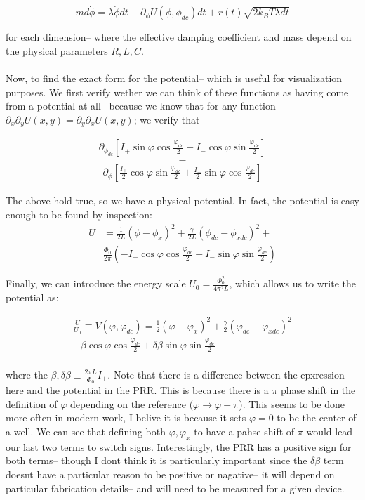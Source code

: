 \documentclass[paper=a4, twocolumn, fontsize=10pt]{article} %
\numberwithin{equation}{section} %
\numberwithin{figure}{section} %
\numberwithin{table}{section} %
\begin{document}
\[ m d \dot{\phi} = \lambda \dot{\phi} dt - \partial_\phi U(\phi, \phi_{dc}) dt + r(t) \sqrt{2 k_B T \lambda dt} \]

for each dimension-- where the effective damping coefficient and mass depend on the physical parameters $R,L,C$.
\\
\\
Now, to find the exact form for the potential-- which is useful for visualization purposes. We first verify wether we can think of these functions as having come from a potential at all-- because we know that for any function $\partial_{x} \partial_{y} U(x,y) = \partial_{y} \partial_{x} U(x,y)$; we verify that

\begin{align}
 \partial_{\phi_{dc}}\left[I_{+} \sin \varphi \cos \frac{\varphi_{dc}}{2} + I_{-} \cos \varphi \sin \frac{\varphi_{dc}}{2}\right]
\end{align}
\[=\]
\begin{align} 
    \partial_{\phi}\left[\frac{I_{+}}{2} \cos \varphi \sin \frac{\varphi_{dc}}{2} + \frac{I_{-}}{2} \sin \varphi \cos \frac{\varphi_{dc}}{2}\right]
\end{align}

The above hold true, so we have a physical potential. In fact, the potential is easy enough to be found by inspection: 
\begin{align}
U &= \frac{1}{2L} (\phi-\phi_x)^2 + \frac{\gamma}{2L} (\phi_{dc}-\phi_{xdc})^2 + \\
 &\frac{\Phi_0}{2\pi}  \left( - I_+ \cos \varphi \cos \frac{\varphi_{dc}}{2} + I_- \sin \varphi \sin \frac{\varphi_{dc}}{2}\right)
\end{align}

Finally, we can introduce the energy scale $U_0 = \frac{ \Phi_0^2}{4\pi^2 L} $, which allows us to write the potential as:

\begin{align}
    \frac{U}{U_0} \equiv V(\varphi, \varphi_{dc}) =  \frac{1}{2} (\varphi-\varphi_x)^2 + \frac{\gamma}{2} (\varphi_{dc}-\varphi_{xdc})^2
    \\
     - \beta \cos \varphi \cos \frac{\varphi_{dc}}{2} + \delta\beta \sin \varphi \sin \frac{\varphi_{dc}}{2}
    \\
\end{align}

where the $\beta,\delta\beta \equiv \frac{2\pi L}{\Phi_0} I_{\pm}$. Note that there is a difference between the epxression here and the potential in the PRR. This is because there is a $\pi$ phase shift in the definition of $\varphi$ depending on the reference ($\varphi \to \varphi-\pi$). This seems to be done more often in modern work, I belive it is because it sets $\varphi=0$ to be the center of a well. We can see that defining both $\varphi,\varphi_{x}$ to have a pahse shift of $\pi$ would lead our last two terms to switch signs. Interestingly, the PRR has a positive sign for both terms-- though I dont think it is particularly important since the $\delta\beta$ term doesnt have a particular reason to be positive or nagative-- it will depend on particular fabrication details-- and will need to be measured for a given device.
\end{document}
